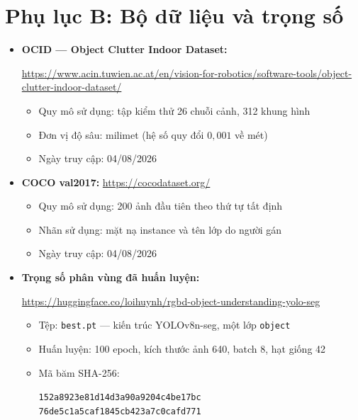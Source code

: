 \section*{Phụ lục B: Bộ dữ liệu và trọng số}
\label{app:dataset}

\begin{itemize}[leftmargin=1.5cm]
\item \textbf{OCID --- Object Clutter Indoor Dataset:}\\
{\small\sloppy\url{https://www.acin.tuwien.ac.at/en/vision-for-robotics/software-tools/object-clutter-indoor-dataset/}\par}
\begin{itemize}
\item Quy mô sử dụng: tập kiểm thử 26 chuỗi cảnh, 312 khung hình
\item Đơn vị độ sâu: milimet (hệ số quy đổi $0{,}001$ về mét)
\item Ngày truy cập: 04/08/2026
\end{itemize}

\item \textbf{COCO val2017:} \url{https://cocodataset.org/}
\begin{itemize}
\item Quy mô sử dụng: 200 ảnh đầu tiên theo thứ tự tất định
\item Nhãn sử dụng: mặt nạ instance và tên lớp do người gán
\item Ngày truy cập: 04/08/2026
\end{itemize}

\item \textbf{Trọng số phân vùng đã huấn luyện:}\\
{\small\sloppy\url{https://huggingface.co/loihuynh/rgbd-object-understanding-yolo-seg}\par}
\begin{itemize}
\item Tệp: \texttt{best.pt} --- kiến trúc YOLOv8n-seg, một lớp \texttt{object}
\item Huấn luyện: 100 epoch, kích thước ảnh 640, batch 8, hạt giống 42
\item Mã băm SHA-256:\\
{\footnotesize\texttt{152a8923e81d14d3a90a9204c4be17bc}\\
\texttt{76de5c1a5caf1845cb423a7c0cafd771}\par}
\end{itemize}
\end{itemize}


